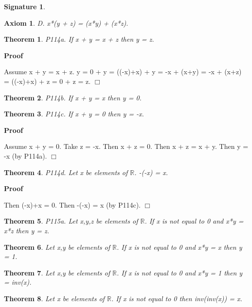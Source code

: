 \documentclass{article}
\newenvironment{forthel}{\begin{leftbar}}{\end{leftbar}}
\newenvironment{proof}{\noindent\textbf{Proof\ }}{\hspace*{\fill}$\Box$\medskip}
\newtheorem{axiom}{Axiom}
\newtheorem{theorem}{Theorem}
\newtheorem{signature}{Signature}
\begin{document}
\begin{forthel}
\begin{signature}
\end{signature}

\begin{axiom} D. x*(y + z) = (x*y) + (x*z).

\end{axiom}



\begin{theorem}
 P114a.
If x + y = x + z then y = z.\end{theorem}
\begin{proof}


Assume x + y = x + z.
y  = 0 + y
= ((-x)+x) + y
= -x + (x+y)
= -x + (x+z)
= ((-x)+x) + z
= 0 + z
= z.
\end{proof}


\begin{theorem}
 P114b.
If x + y = x then y = 0.
\end{theorem}
\begin{theorem}
 P114c. 
If x + y = 0 then y = -x.\end{theorem}
\begin{proof}

Assume x + y = 0.
Take z = -x. Then x + z = 0.
Then x + z = x + y. Then y = -x (by P114a).
\end{proof}

\begin{theorem}
 P114d. 
Let x be elements of $\mathbb{R}$. -(-x) = x.
\end{theorem}
\begin{proof}

Then (-x)+x = 0.
Then -(-x) = x (by P114c).
\end{proof}



\begin{theorem}
 P115a.
Let x,y,z be elements of $\mathbb{R}$. If x is not equal to 0 and x*y = x*z then y = z.\end{theorem}
\begin{theorem}
Let x,y be elements of $\mathbb{R}$. If x is not equal to 0 and x*y = x then y = 1.\end{theorem}
\begin{theorem}

Let x,y be elements of $\mathbb{R}$. If x is not equal to 0 and x*y = 1 then y = inv(x).\end{theorem}
\begin{theorem}

Let x be elements of $\mathbb{R}$. If x is not equal to 0 then inv(inv(x)) = x.\end{theorem}




\end{forthel}
\end{document}
